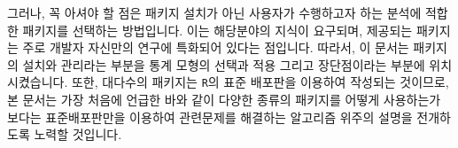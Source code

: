 \documentclass[tutorial.tex]{subfiles}
\begin{document}
그러나, 꼭 아셔야 할 점은 패키지 설치가 아닌 사용자가 수행하고자 하는 분석에 적합한 패키지를 선택하는 방법입니다. 
이는 해당분야의 지식이 요구되며, 제공되는 패키지는 주로 개발자 자신만의 연구에 특화되어 있다는 점입니다. 
따라서, 이 문서는 패키지의 설치와 관리라는 부분을 통계 모형의 선택과 적용 그리고 장단점이라는 부분에 위치시켰습니다. 
또한, 대다수의 패키지는 \texttt{R}의 표준 배포판을 이용하여 작성되는 것이므로, 본 문서는 가장 처음에 언급한 바와 같이 다양한 종류의 패키지를 어떻게 사용하는가 보다는 표준배포판만을 이용하여 관련문제를 해결하는 알고리즘 위주의 설명을 전개하도록 노력할 것입니다. 


\begin{comment}
\paragraph{한글 표현과 인코딩에 관련하여:}   
\texttt{R}은 한국어 사용자를 위한 한국어 인터페이스를 지원하고 있습니다. 
그러나, 사용자는 이러한 한국어 지원이 단순히 사용자의 편의를 위한 선택적 사항이라는 점을 반드시 알고 있어야 합니다.
또한, 분석시 본래의 정교한 표현은 번역된 한국어 보다는 원래의 영문이라는 점도 잊지 마셔야 합니다. 
%
현재 한국어에 관련된 작업은 UTF-8이라는 인코딩에 기반하여 한국어 품질관리 프로그램 (\url{http://ihelp.r-forge.r-project.org/lang_msg.html})을 통하여 이루어 지고 있으나, \texttt{R}을 한국어가 아닌 영문으로 설정하기 위해서는 다음의 주소를 눌러 그 내용을 확인해주시길 부탁드립니다. 
이 내용은 버전에 관계없이 일반적으로 통용되는 방법이나 윈도우즈 사용자에게 맞추어 작성되었습니다. 

\url{http://lists.r-forge.r-project.org/pipermail/ihelp-urquestion/2013-April/000003.html}

본래 데이터를 자국의 언어로 표현하는 방법은 UTF-8 이라는 인코딩을 이용하므로, 간혹 데이터가 올바르게 보이지 않을 경우가 있습니다. 
이러한 문제를 해결하기 위해서는 ``R을 지원하는 인코딩 중 올바르게 한국어를 표현해주는 코드를 찾는 방법'' (\url{http://lists.r-forge.r-project.org/pipermail/ihelp-urquestion/2013-April/000017.html}) 를 읽어보시길 바랍니다.

간혹, 잘못된 한글처리가 시스템 에러를 야기하는 경우가 있으므로, 이러한 경우에 한국어로 R을 사용하시는 분들께서는 다소 번거로우실지라도 보다 안정적이고 나은 R을 제공하기 위하여 그 내용을 \href{mailto:ihelp-urquestion@lists.r-forge.r-project.org}{ihelp-urquestion@lists.r-forge.r-project.org} 주소로 이메일을 보내주신다면 감사하겠습니다. 

단, 이러한 한글처리는 분석에 연관된 수치연산과는 아무런 관계가 없음을 반드시 알아주시길 부탁드립니다.
%
\end{comment}
\end{document}
